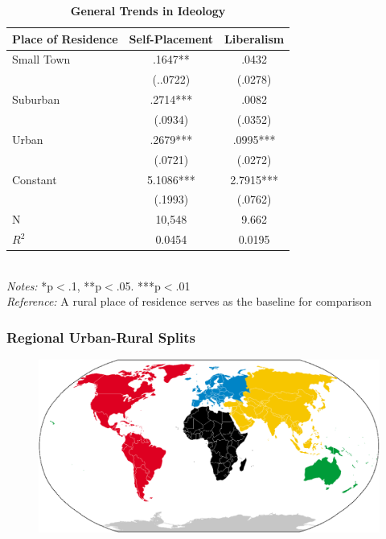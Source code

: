 \documentclass[20pt]{beamer}
\newcommand\e{\emph}
\newcommand\tb{\textbf}
\begin{document}
\begin{frame}
\tiny
\begin{table}[H]
		\centering
		\caption{\tb{General Trends in Ideology}}
		\begin{tabulary}{\linewidth}{l c c}
			\\
			\hline
			\tb{Place of Residence}&\tb{Self-Placement}&\tb{Liberalism} \\
			\hline
			Small Town&.1647**&.0432  \\    
			& (..0722) &(.0278)  \\
			Suburban & .2714*** &.0082\\ 
			& (.0934) &(.0352) \\
			Urban   & .2679*** &.0995***  \\
			& (.0721)  &(.0272)  \\
			Constant   & 5.1086*** &2.7915*** \\
			&(.1993)&(.0762)  \\
			N  & 10,548 &9.662  \\
			$R^2$	& 0.0454&0.0195 \\
			\hline                                       
		\end{tabulary}
		\\
		\e{Notes:} *p$<$.1, **p$<$.05. ***p$<$.01 \\
		\e{Reference:} A rural place of residence serves as the baseline for comparison

\end{table}
\end{frame}

\begin{frame}
\frametitle{Regional Urban-Rural Splits}
\begin{figure}[H]    \centering
	{	 \includegraphics[width=\textwidth]{Regions}}
\end{figure}
\end{frame}
\end{document}

